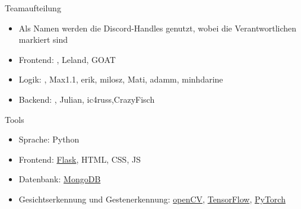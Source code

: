 \documentclass[xcolor=x11names,table]{beamer}
\begin{document}
\begin{frame}{Teamaufteilung}
\begin{itemize}
    \item Als Namen werden die Discord-Handles genutzt, wobei die
    Verantwortlichen  markiert sind
    \item Frontend: , Leland, GOAT
    \item Logik: , Max1.1, erik, milosz, Mati,
    adamm, minhdarine
    \item Backend: , Julian, ic4russ,CrazyFisch
\end{itemize}
\end{frame}

\begin{frame}{Tools}
\begin{itemize}
    \item Sprache: Python
    \item Frontend: 
    \href{https://flask.palletsprojects.com/en/2.2.x/}{Flask}, 
    HTML, CSS, JS
    \item Datenbank: \href{https://www.mongodb.com/}{MongoDB}
    \item Gesichtserkennung und Gestenerkennung: 
    \href{https://pypi.org/project/opencv-python/}{openCV},
    \href{https://pytorch.org/}{TensorFlow},
    \href{https://pytorch.org/}{PyTorch}
\end{itemize}
\end{frame}
\end{document}
